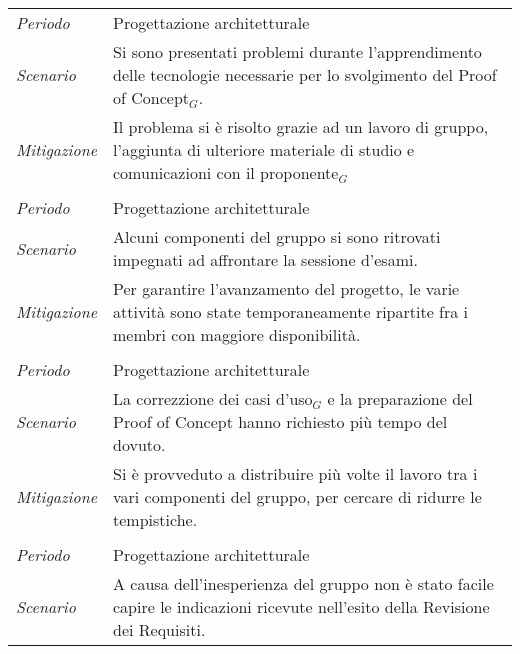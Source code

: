 {\def\tabularxcolumn#1{m{#1}}
{
	
	\begin{center}
		\renewcommand{\arraystretch}{1.4}
		\begin{longtable}{|p{5cm}|p{12cm}|}
			\hline
		\rowcolor{airforceblue}
		\multicolumn{2}{|c|}{\textit{RT1- Inesperienza tecnologica}}\\
		\hline
		\textit{Periodo} & Progettazione architetturale \\
		\hline
		\textit{Scenario} & Si sono presentati problemi durante l'apprendimento delle tecnologie necessarie per lo svolgimento del Proof of Concept$_G$. \\
		\hline
		\textit{Mitigazione} & Il problema si è risolto grazie ad un lavoro di gruppo, l'aggiunta di ulteriore materiale di studio e comunicazioni con il proponente$_G$ \\
		\hline
		\rowcolor{airforceblue}
		\multicolumn{2}{|c|}{\textit{RO2- Impegni personali}}\\
		\hline
		\textit{Periodo} & Progettazione architetturale \\
		\hline
		\textit{Scenario} & Alcuni componenti del gruppo si sono ritrovati impegnati ad affrontare la sessione d'esami. \\
		\hline
		\textit{Mitigazione} & Per garantire l'avanzamento del progetto, le varie attività sono state temporaneamente ripartite fra i membri con maggiore disponibilità. \\
			\hline
		\rowcolor{airforceblue}
		\multicolumn{2}{|c|}{\textit{RO3- Calcolo dei tempi e dei costi}}\\
		\hline
		\textit{Periodo} & Progettazione architetturale \\
		\hline
		\textit{Scenario} & La correzzione dei casi d'uso$_G$ e la preparazione del Proof of Concept hanno richiesto più tempo del dovuto. \\
		\hline
		\textit{Mitigazione} & Si è provveduto a distribuire più volte il lavoro tra i vari componenti del gruppo, per cercare di ridurre le tempistiche. \\
			\hline
			\rowcolor{airforceblue}
			\multicolumn{2}{|c|}{\textit{RO4- Inesperienza nel coordinamento}}\\
			\hline
			\textit{Periodo} & Progettazione architetturale \\
			\hline
			\textit{Scenario} & A causa dell'inesperienza del gruppo non è stato facile capire le indicazioni ricevute nell'esito della Revisione dei Requisiti. \\

\end{longtable}
\end{center}}}
